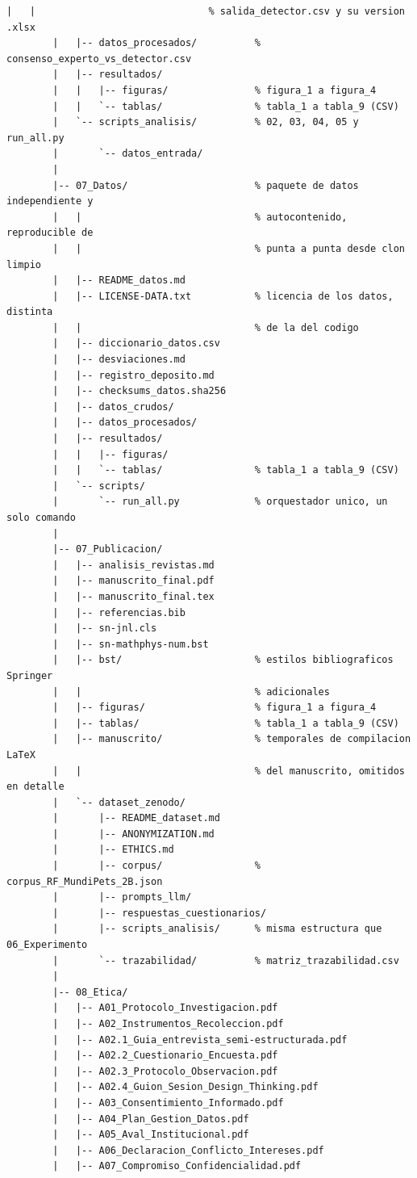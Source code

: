 \documentclass[journal,onecolumn]{IEEEtran}
\begin{document}
\begin{lstlisting}[style=csharp,caption={Estructura de carpetas del repositorio MundiPets-PFC-IngReq.},label={lst:estructura_repo}]
		|   |                              % salida_detector.csv y su version .xlsx
		|   |-- datos_procesados/          % consenso_experto_vs_detector.csv
		|   |-- resultados/
		|   |   |-- figuras/               % figura_1 a figura_4
		|   |   `-- tablas/                % tabla_1 a tabla_9 (CSV)
		|   `-- scripts_analisis/          % 02, 03, 04, 05 y run_all.py
		|       `-- datos_entrada/
		|
		|-- 07_Datos/                      % paquete de datos independiente y
		|   |                              % autocontenido, reproducible de
		|   |                              % punta a punta desde clon limpio
		|   |-- README_datos.md
		|   |-- LICENSE-DATA.txt           % licencia de los datos, distinta
		|   |                              % de la del codigo
		|   |-- diccionario_datos.csv
		|   |-- desviaciones.md
		|   |-- registro_deposito.md
		|   |-- checksums_datos.sha256
		|   |-- datos_crudos/
		|   |-- datos_procesados/
		|   |-- resultados/
		|   |   |-- figuras/
		|   |   `-- tablas/                % tabla_1 a tabla_9 (CSV)
		|   `-- scripts/
		|       `-- run_all.py             % orquestador unico, un solo comando
		|
		|-- 07_Publicacion/
		|   |-- analisis_revistas.md
		|   |-- manuscrito_final.pdf
		|   |-- manuscrito_final.tex
		|   |-- referencias.bib
		|   |-- sn-jnl.cls
		|   |-- sn-mathphys-num.bst
		|   |-- bst/                       % estilos bibliograficos Springer
		|   |                              % adicionales
		|   |-- figuras/                   % figura_1 a figura_4
		|   |-- tablas/                    % tabla_1 a tabla_9 (CSV)
		|   |-- manuscrito/                % temporales de compilacion LaTeX
		|   |                              % del manuscrito, omitidos en detalle
		|   `-- dataset_zenodo/
		|       |-- README_dataset.md
		|       |-- ANONYMIZATION.md
		|       |-- ETHICS.md
		|       |-- corpus/                % corpus_RF_MundiPets_2B.json
		|       |-- prompts_llm/
		|       |-- respuestas_cuestionarios/
		|       |-- scripts_analisis/      % misma estructura que 06_Experimento
		|       `-- trazabilidad/          % matriz_trazabilidad.csv
		|
		|-- 08_Etica/
		|   |-- A01_Protocolo_Investigacion.pdf
		|   |-- A02_Instrumentos_Recoleccion.pdf
		|   |-- A02.1_Guia_entrevista_semi-estructurada.pdf
		|   |-- A02.2_Cuestionario_Encuesta.pdf
		|   |-- A02.3_Protocolo_Observacion.pdf
		|   |-- A02.4_Guion_Sesion_Design_Thinking.pdf
		|   |-- A03_Consentimiento_Informado.pdf
		|   |-- A04_Plan_Gestion_Datos.pdf
		|   |-- A05_Aval_Institucional.pdf
		|   |-- A06_Declaracion_Conflicto_Intereses.pdf
		|   |-- A07_Compromiso_Confidencialidad.pdf

\end{lstlisting}
\end{document}

